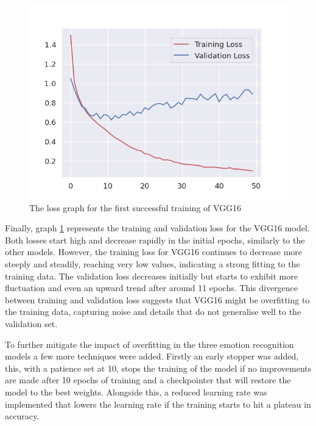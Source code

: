 \begin{figure}[H]
    \centering{}
    \includegraphics[scale=0.5]{fed_images/train_loss_VGG16.png}
    \caption{The loss graph for the first successful training of VGG16}
    \label{figure:loss_vgg16}
\end{figure}

Finally, graph \ref{figure:loss_vgg16} represents the training and validation loss for the VGG16 model. Both losses start high and decrease rapidly in the initial epochs, similarly to the other models. However, the training loss for VGG16 continues to decrease more steeply and steadily, reaching very low values, indicating a strong fitting to the training data. The validation loss decreases initially but starts to exhibit more fluctuation and even an upward trend after around 11 epochs. This divergence between training and validation loss suggests that VGG16 might be overfitting to the training data, capturing noise and details that do not generalise well to the validation set.

To further mitigate the impact of overfitting in the three emotion recognition models a few more techniques were added. Firstly an early stopper was added, this, with a patience set at 10, stops the training of the model if no improvements are made after 10 epochs of training and a checkpointer that will restore the model to the best weights. Alongside this, a reduced learning rate was implemented that lowers the learning rate if the training starts to hit a plateau in accuracy.

